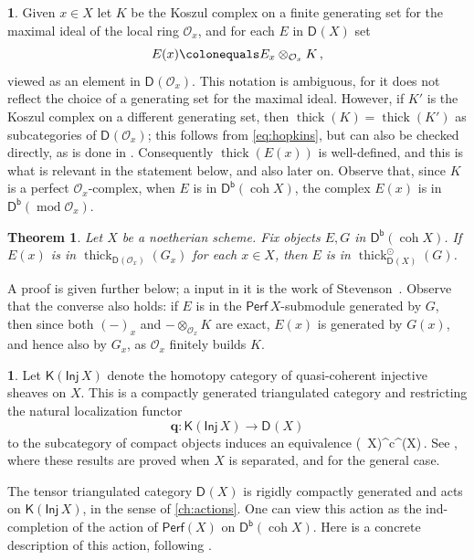 \documentclass{amsart}
\let\oldequation\equation
\let\oldendequation\endequation
\renewenvironment{equation}{\linenomathNonumbers\oldequation}{\oldendequation\endlinenomath}
\newcommand{\dcat}[2][]{\cat{D}_{#1}(#2)}
\newcommand{\kinj}[1]{\cat{K}(\cat{Inj}\,#1)}
\newcommand{\perf}[1]{\mathsf{Perf}\,#1}
\newcommand{\coh}{\operatorname{coh}}
\newcommand{\dbcat}[1]{\cat{D}^{\mathsf{b}}(#1)}
\newcommand{\mco}{\mathcal{O}}
\newcommand{\bfq}{\boldsymbol{q}}
\newcommand{\cat}[1]{{\mathsf{#1}}}
\newcommand{\rmod}{\operatorname{mod}}
\newcommand{\res}[2]{{#1}(#2)}
\newcommand{\thick}{\operatorname{thick}}
\newtheorem{theorem}[subsection]{Theorem}
\theoremstyle{definition}
\newtheorem{chunk}[subsection]{}
\theoremstyle{remark}
\numberwithin{equation}{subsection}
\begin{document}
\begin{chunk}
Given $x\in X$ let $K$ be the Koszul complex on a finite generating set for the maximal ideal of the local ring $\mco_{x}$, and for each $E$ in $\dcat X$ set
\[
\res{E}x \colonequals E_x\otimes_{\mco_x}K\,,
\]
viewed as an element in $\dcat{\mco_{x}}$. This notation is ambiguous, for it does not reflect the choice of a generating set for the maximal ideal. However, if $K'$ is the Koszul complex on a different generating set, then 
$\thick(K)=\thick(K')$ as subcategories of $\dcat{\mco_x}$; this follows from \eqref{eq:hopkins}, but can also be checked directly, as is done in \cite[Lemma~6.0.9]{Hovey/Palmieri/Strickland:1997}. Consequently $\thick(\res{E}x)$ is well-defined, and this is what is relevant in the statement below, and also later on. Observe that, since $K$ is a perfect $\mco_{x}$-complex, when $E$ is in $\dbcat{\coh X} $, the complex $\res{E}x$ is in $\dbcat{\rmod \mco_{x}}$. 

\begin{theorem}
\label{th:local-global}
Let $X$ be a noetherian scheme. Fix objects $E,G$ in $\dbcat{\coh X}$. If $\res{E}x$ is in $\thick_{\dcat{\mco_x}}( G_x)$ for each $x\in X$, then $E$ is in $\thick^{\odot}_{\dcat X}(G)$.
\end{theorem}

A proof is given further below; a input in it is the work of Stevenson~\cite{Stevenson:2014a}.  Observe that the converse also holds: if $E$ is in the $\perf X$-submodule generated by $G$, then since both $(-)_x$ and $-\otimes_{\mco_x}K$ are exact, $\res{E}x$ is generated by $\res{G}x$, and hence also by $G_x$, as $\mco_x$ finitely builds $K$.

\begin{chunk}
\label{ch:kinj-X}
Let $\kinj{ X}$ denote the homotopy category of quasi-coherent injective sheaves on $X$. This is a compactly generated triangulated category and restricting the natural localization functor 
\[
\bfq\colon \kinj{X}\longrightarrow \dcat X
\]
to the subcategory of compact objects induces an equivalence
\begin{equation}
\label{eq:kinjc}
\kinj{ X}^{\mathsf c}\xrightarrow{\ \sim\ }\dbcat{\coh X}\,.
\end{equation}
See \cite[Theorem~1.1]{Krause:2005}, where these results are proved when $X$ is separated, and \cite[Appendix~B]{Coupek/Stovicek:2020} for the general case.

The tensor triangulated category $\dcat{X}$ is rigidly compactly generated and acts on $\kinj{X}$, in the sense of \cref{ch:actions}. One can view this action as the ind-completion of the action of $\cat{Perf}(X)$ on $\dbcat{\coh X}$. Here is a concrete description of this action, following \cite[Section~3]{Stevenson:2014a}.


\end{chunk}
\end{chunk}
\end{document}
